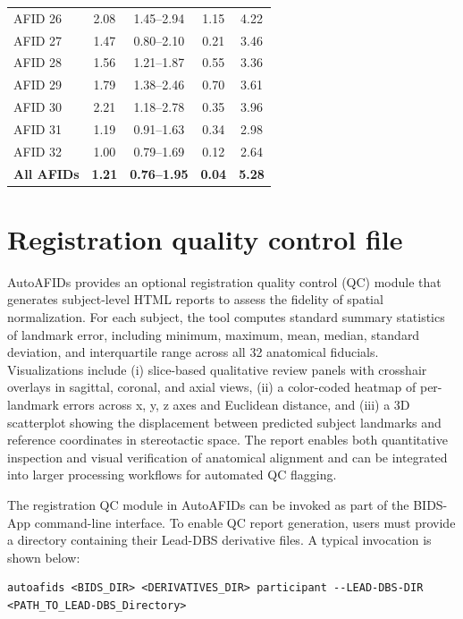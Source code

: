 \begin{table}[H]
\begin{tabular}{lcccc}
AFID 26 & 2.08 & 1.45--2.94 & 1.15 & 4.22 \\
AFID 27 & 1.47 & 0.80--2.10 & 0.21 & 3.46 \\
AFID 28 & 1.56 & 1.21--1.87 & 0.55 & 3.36 \\
AFID 29 & 1.79 & 1.38--2.46 & 0.70 & 3.61 \\
AFID 30 & 2.21 & 1.18--2.78 & 0.35 & 3.96 \\
AFID 31 & 1.19 & 0.91--1.63 & 0.34 & 2.98 \\
AFID 32 & 1.00 & 0.79--1.69 & 0.12 & 2.64 \\
\midrule
\textbf{All AFIDs} & \textbf{1.21} & \textbf{0.76--1.95} & \textbf{0.04} & \textbf{5.28} \\
\bottomrule
\end{tabular}
\end{table}

\newpage
\section{Registration quality control file}
AutoAFIDs provides an optional registration quality control (QC) module that generates subject-level HTML reports to assess the fidelity of spatial normalization. For each subject, the tool computes standard summary statistics of landmark error, including minimum, maximum, mean, median, standard deviation, and interquartile range across all 32 anatomical fiducials. Visualizations include (i) slice-based qualitative review panels with crosshair overlays in sagittal, coronal, and axial views, (ii) a color-coded heatmap of per-landmark errors across x, y, z axes and Euclidean distance, and (iii) a 3D scatterplot showing the displacement between predicted subject landmarks and reference coordinates in stereotactic space. The report enables both quantitative inspection and visual verification of anatomical alignment and can be integrated into larger processing workflows for automated QC flagging.

The registration QC module in AutoAFIDs can be invoked as part of the BIDS-App command-line interface. To enable QC report generation, users must provide a directory containing their Lead-DBS derivative files. A typical invocation is shown below:

\begin{verbatim}
autoafids <BIDS_DIR> <DERIVATIVES_DIR> participant --LEAD-DBS-DIR <PATH_TO_LEAD-DBS_Directory>
\end{verbatim}

